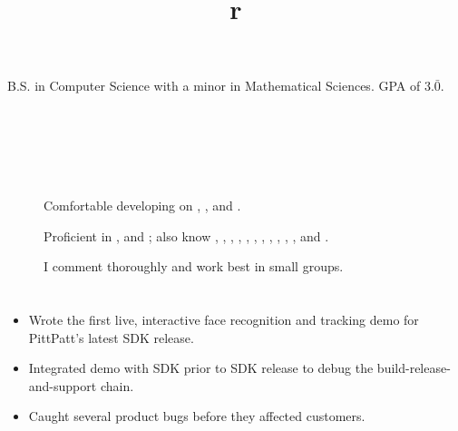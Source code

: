 
B.S. in Computer Science with a minor in Mathematical Sciences. GPA of
$3.\bar0$.


\begin{formatb}
\title{r}\\
\\
\body\\
\end{formatb}

%

\section{}
\begin{description}

\item[]
Comfortable developing on , ,  and .
\item[]
Proficient in , \kw{\Cplusplus} and ;
also know , \kw{\CSharp}, , , , , ,
\kw{\LaTeX}, , , ,  and .
\item[]
I comment thoroughly and work best in small groups.


\end{description}

\section{}

\begin{itemize}
\item Wrote the first live, interactive face recognition and tracking demo for
      PittPatt's latest SDK release.
\item Integrated demo with SDK prior to SDK release to debug the
      build-release-and-support chain.
\item Caught several product bugs before they affected customers.
\end{itemize}
\setlength{\parskip}{8pt}

